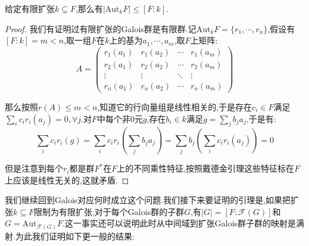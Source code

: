 给定有限扩张$k\subseteq F$,那么有$|\mathrm{Aut}_kF|\le[F:k]$.
\begin{proof}
	
	我们有证明过有限扩张的Galois群是有限群.记$\mathrm{Aut}_kF=\{r_1,\cdots,r_n\}$,假设有$[F:k]=m<n$,取一组$F$在$k$上的基为$a_1,\cdots,a_m$,取$F$上矩阵:
	$$A=\left(\begin{array}{cccc}
	r_1(a_1)&r_1(a_2)&\cdots&r_1(a_m)\\
	r_2(a_1)&r_2(a_2)&\cdots&r_2(a_m)\\
	\vdots&\vdots&\ddots&\vdots\\
	r_n(a_1)&r_n(a_2)&\cdots&r_n(a_m)
	\end{array}\right)$$
	
	那么按照$r(A)\le m<n$,知道它的行向量组是线性相关的,于是存在$c_i\in F$满足$\sum_ic_ir_i(a_j)=0,\forall j$.对$F$中每个非0元$g$,存在$b_i\in k$满足$g=\sum_jb_ja_j$,于是有:
	$$\sum_ic_ir_i(g)=\sum_ic_ir_i(\sum_jb_ja_j)=\sum_jb_j\left(\sum_ic_ir_i(a_j)\right)=0$$
	
	但是注意到每个$r_i$都是群$F^*$在$F$上的不同乘性特征,按照戴德金引理这些特征标在$F$上应该是线性无关的,这就矛盾.
\end{proof}

我们继续回到Galois对应何时成立这个问题.我们接下来要证明的引理是,如果把扩张$k\subseteq F$限制为有限扩张,对于每个Galois群的子群$G$,有$|G|=[F:\mathscr{F}(G)]$和$G=\mathrm{Aut}_{\mathscr{F}(G)}F$.这一事实还可以说明此时从中间域到扩张Galois群子群的映射是满射.为此我们证明如下更一般的结果:

